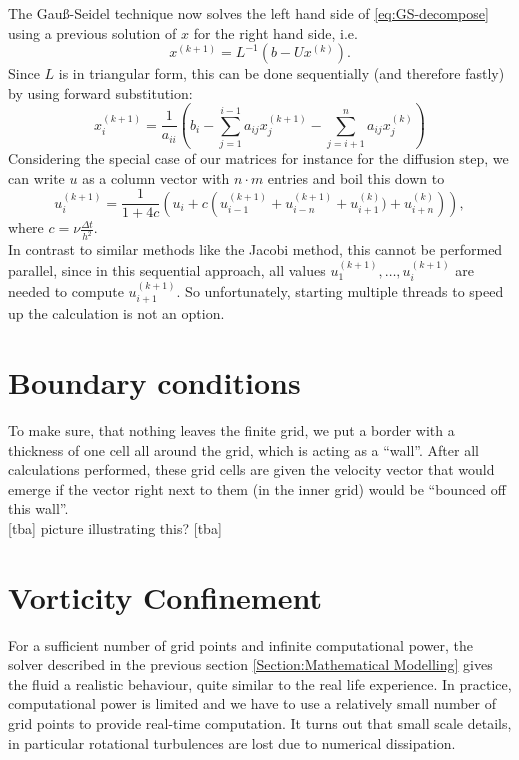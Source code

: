 \documentclass[a4paper,10pt,oneside,final,german,openbib,pdftex,titlepage]{scrbook}
\begin{document}
The Gauß-Seidel technique now solves the left hand side of \ref{eq:GS-decompose} using a previous solution of $x$ for the right hand side, i.e.
\begin{equation}
x^{(k+1)}=L^{-1}(b-Ux^{(k)}).
\end{equation}
Since $L$ is in triangular form, this can be done sequentially (and therefore fastly) by using forward substitution:
\begin{equation}
x^{(k+1)}_i=\frac{1}{a_{ii}}\left( b_i - \sum_{j=1}^{i-1} a_{ij}x_j^{(k+1)} - \sum_{j=i+1}^{n} a_{ij}x_j^{(k)} \right)
\end{equation} Considering the special case of our matrices for instance for the diffusion step, we can write $u$ as a column vector with $n\cdot m$ entries and boil  this down to
\begin{equation}
u^{(k+1)}_i = \frac{1}{1+4c} \left( u_i + c\left(u^{(k+1)}_{i-1} + u^{(k+1)}_{i-n} + u^{(k)}_{i+1}) + u^{(k)}_{i+n}\right) \right),
\end{equation}
where $c= \nu\frac{\Delta t}{h^2}$.\\

In contrast to similar methods like the Jacobi method, this cannot be performed parallel, since in this sequential approach, all values $u_1^{(k+1)}, \dots, u_i^{(k+1)}$ are needed to compute $u_{i+1}^{(k+1)}$. So unfortunately, starting multiple threads to speed up the calculation is not an option.

\section{Boundary conditions}
To make sure, that nothing leaves the finite grid, we put a border with a thickness of one cell all around the grid, which is acting as a ``wall''. After all calculations performed, these grid cells are given the velocity vector that would emerge if the vector right next to them (in the inner grid) would be ``bounced off this wall''.\\

[tba] picture illustrating this? [tba]

\section{Vorticity Confinement}
For a sufficient number of grid points and infinite computational power, the solver described in the previous section \ref{Section:Mathematical Modelling} gives the fluid a realistic behaviour, quite similar to the real life experience. In practice, computational power is limited and we have to use a relatively small number of grid points to provide real-time computation. It turns out that small scale details, in particular rotational turbulences are lost due to numerical dissipation.\\
\end{document}
